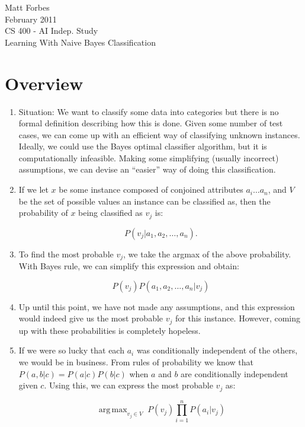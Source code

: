 \documentclass[a4paper,12pt]{article}
\DeclareMathOperator*{\argmax}{arg\,max}
\begin{document}
Matt Forbes \\
February 2011 \\
CS 400 - AI Indep. Study \\
Learning With Naive Bayes Classification

\section*{Overview}

\begin{enumerate}[]
  \item Situation: We want to classify some data into categories but
    there is no formal definition describing how this is done. Given
    some number of test cases, we can come up with an efficient way of
    classifying unknown instances. Ideally, we could use the Bayes
    optimal classifier algorithm, but it is computationally
    infeasible. Making some simplifying (usually incorrect)
    assumptions, we can devise an ``easier'' way of doing this
    classification.
  
  \item If we let $x$ be some instance composed of conjoined
    attributes $a_i \dots a_n$, and $V$ be the set of possible values
    an instance can be classified as, then the probability of $x$
    being classified as $v_j$ is:
    
    \[P(v_j|a_1,a_2, \dots ,a_n). \]
    
  \item To find the most probable $v_j$, we take the argmax of the
    above probability. With Bayes rule, we can simplify this
    expression and obtain:
    
    \[P(v_j)P(a_1,a_2, \dots ,a_n|v_j)\]

  \item Up until this point, we have not made any assumptions, and
    this expression would indeed give us the most probable $v_j$ for
    this instance. However, coming up with these probabilities is
    completely hopeless. 
    
  \item If we were so lucky that each $a_i$ was conditionally
    independent of the others, we would be in business. From rules of
    probability we know that $P(a,b|c) = P(a|c)P(b|c)$ when $a$ and
    $b$ are conditionally independent given $c$. Using this, we can
    express the most probable $v_j$ as:
    
    \[\argmax_{v_j \in V} \; P(v_j)\prod_{i=1}^nP(a_i|v_j)\]


\end{enumerate}
\end{document}
